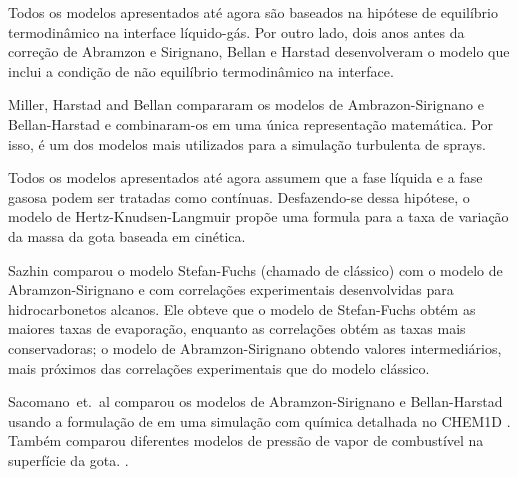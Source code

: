 Todos os modelos apresentados até agora são baseados na hipótese de equilíbrio termodinâmico na interface líquido-gás.
Por outro lado, dois anos antes da correção de Abramzon e Sirignano, Bellan e Harstad \cite{BellanJ1987} desenvolveram o modelo que inclui a condição de não equilíbrio termodinâmico na interface.

Miller, Harstad and Bellan \cite{MillerR1998} compararam os modelos de Ambrazon-Sirignano e Bellan-Harstad e combinaram-os em uma única representação matemática.
Por isso, é um dos modelos mais utilizados para a simulação turbulenta de sprays.  

Todos os modelos apresentados até agora assumem que a fase líquida e a fase gasosa podem ser tratadas como contínuas.
Desfazendo-se dessa hipótese, o modelo de Hertz-Knudsen-Langmuir  propõe uma formula para a taxa de variação da massa da gota baseada em cinética.

Sazhin \cite{Sazhin2006} comparou o modelo Stefan-Fuchs (chamado de clássico) com o modelo de Abramzon-Sirignano e com correlações experimentais desenvolvidas para hidrocarbonetos alcanos.
Ele obteve que o modelo de Stefan-Fuchs obtém as maiores taxas de evaporação, enquanto as correlações obtém as taxas mais conservadoras; o modelo de Abramzon-Sirignano obtendo valores intermediários, mais próximos das correlações experimentais que do modelo clássico.

Sacomano~et.~al \cite{SacomanoF2019IJHMT} comparou os modelos de Abramzon-Sirignano e Bellan-Harstad usando a formulação de \cite{MillerR1998} em uma simulação com química detalhada no CHEM1D \cite{Sommers1994PhD}.
Também comparou diferentes modelos de pressão de vapor de combustível na superfície da gota.
 .


